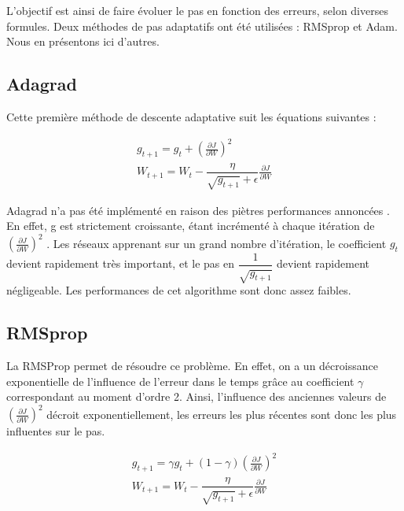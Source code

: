 L'objectif est ainsi de faire évoluer le pas en fonction des erreurs, selon diverses formules. Deux méthodes de pas adaptatifs ont été utilisées : RMSprop et Adam. Nous en présentons ici d'autres.

\subsection{Adagrad}

Cette première méthode de descente adaptative suit les équations suivantes :

\begin{equation}
\begin{aligned}
g_{t+1} = g_t + (\frac{\partial J}{\partial W})^2 \\
W_{t+1} = W_t - \dfrac{\eta}{\sqrt{g_{t+1}} + \epsilon}\frac{\partial J}{\partial W}
\end{aligned}
\end{equation} 

Adagrad n'a pas été implémenté en raison des piètres performances annoncées \cite{ruder_overview_2016}. En effet, g est strictement croissante, étant incrémenté à chaque itération de $(\frac{\partial J}{\partial W})^2$ . Les réseaux apprenant sur un grand nombre d'itération, le coefficient $g_{t}$ devient rapidement très important, et le pas en $\dfrac{1}{\sqrt{g_{t+1}}}$ devient rapidement négligeable. Les performances de cet algorithme sont donc assez faibles.

\subsection{RMSprop}

La RMSProp permet de résoudre ce problème. En effet, on a un décroissance exponentielle de l'influence de l'erreur dans le temps grâce au coefficient $\gamma$ correspondant au moment d'ordre 2. Ainsi, l'influence des anciennes valeurs de $(\frac{\partial J}{\partial W})^2$ décroit exponentiellement, les erreurs les plus récentes sont donc les plus influentes sur le pas.

\begin{equation} 
\begin{aligned}
g_{t+1} = \gamma g_t + (1-\gamma)(\frac{\partial J}{\partial W})^2 \\
W_{t+1} = W_t - \dfrac{\eta}{\sqrt{g_{t+1}} + \epsilon}\frac{\partial J}{\partial W}
\end{aligned}
\end{equation} 

